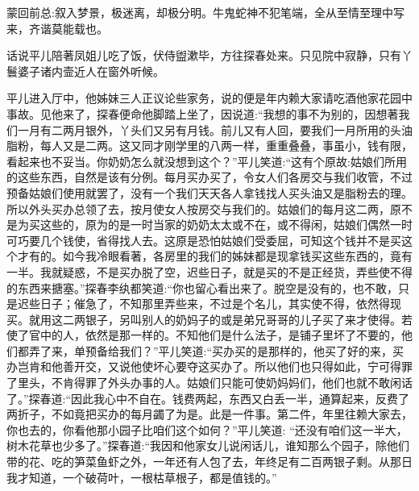 

\begin{parag}
    \begin{note}蒙回前总:叙入梦景，极迷离，却极分明。牛鬼蛇神不犯笔端，全从至情至理中写来，齐谐莫能载也。\end{note}
\end{parag}


\begin{parag}
    话说平儿陪著凤姐儿吃了饭，伏侍盥漱毕，方往探春处来。只见院中寂静，只有丫鬟婆子诸内壸近人在窗外听候。
\end{parag}


\begin{parag}
    平儿进入厅中，他姊妹三人正议论些家务，说的便是年内赖大家请吃酒他家花园中事故。见他来了，探春便命他脚踏上坐了，因说道:“我想的事不为别的，因想著我们一月有二两月银外，丫头们又另有月钱。前儿又有人回，要我们一月所用的头油脂粉，每人又是二两。这又同才刚学里的八两一样，重重叠叠，事虽小，钱有限，看起来也不妥当。你奶奶怎么就没想到这个？”平儿笑道:“这有个原故:姑娘们所用的这些东西，自然是该有分例。每月买办买了，令女人们各房交与我们收管，不过预备姑娘们使用就罢了，没有一个我们天天各人拿钱找人买头油又是脂粉去的理。所以外头买办总领了去，按月使女人按房交与我们的。姑娘们的每月这二两，原不是为买这些的，原为的是一时当家的奶奶太太或不在，或不得闲，姑娘们偶然一时可巧要几个钱使，省得找人去。这原是恐怕姑娘们受委屈，可知这个钱并不是买这个才有的。如今我冷眼看著，各房里的我们的姊妹都是现拿钱买这些东西的，竟有一半。我就疑惑，不是买办脱了空，迟些日子，就是买的不是正经货，弄些使不得的东西来搪塞。”探春李纨都笑道:“你也留心看出来了。脱空是没有的，也不敢，只是迟些日子；催急了，不知那里弄些来，不过是个名儿，其实使不得，依然得现买。就用这二两银子，另叫别人的奶妈子的或是弟兄哥哥的儿子买了来才使得。若使了官中的人，依然是那一样的。不知他们是什么法子，是铺子里坏了不要的，他们都弄了来，单预备给我们？”平儿笑道:“买办买的是那样的，他买了好的来，买办岂肯和他善开交，又说他使坏心要夺这买办了。所以他们也只得如此，宁可得罪了里头，不肯得罪了外头办事的人。姑娘们只能可使奶妈妈们，他们也就不敢闲话了。”探春道:“因此我心中不自在。钱费两起，东西又白丢一半，通算起来，反费了两折子，不如竟把买办的每月蠲了为是。此是一件事。第二件，年里往赖大家去，你也去的，你看他那小园子比咱们这个如何？”平儿笑道: “还没有咱们这一半大，树木花草也少多了。”探春道:“我因和他家女儿说闲话儿，谁知那么个园子，除他们带的花、吃的笋菜鱼虾之外，一年还有人包了去，年终足有二百两银子剩。从那日我才知道，一个破荷叶，一根枯草根子，都是值钱的。”
\end{parag}


